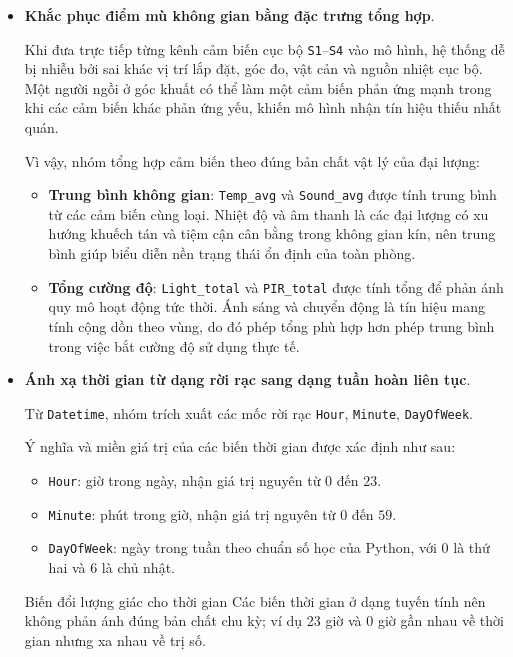 \begin{itemize}
    \item \textbf{Khắc phục điểm mù không gian bằng đặc trưng tổng hợp}.

    Khi đưa trực tiếp từng kênh cảm biến cục bộ \texttt{S1}--\texttt{S4} vào mô hình, hệ thống dễ bị nhiễu bởi sai khác vị trí lắp đặt, góc đo, vật cản và nguồn nhiệt cục bộ. Một người ngồi ở góc khuất có thể làm một cảm biến phản ứng mạnh trong khi các cảm biến khác phản ứng yếu, khiến mô hình nhận tín hiệu thiếu nhất quán.

    Vì vậy, nhóm tổng hợp cảm biến theo đúng bản chất vật lý của đại lượng:
    \begin{itemize}
        \item \textbf{Trung bình không gian}: \texttt{Temp\_avg} và \texttt{Sound\_avg} được tính trung bình từ các cảm biến cùng loại. Nhiệt độ và âm thanh là các đại lượng có xu hướng khuếch tán và tiệm cận cân bằng trong không gian kín, nên trung bình giúp biểu diễn nền trạng thái ổn định của toàn phòng.
        \item \textbf{Tổng cường độ}: \texttt{Light\_total} và \texttt{PIR\_total} được tính tổng để phản ánh quy mô hoạt động tức thời. Ánh sáng và chuyển động là tín hiệu mang tính cộng dồn theo vùng, do đó phép tổng phù hợp hơn phép trung bình trong việc bắt cường độ sử dụng thực tế.
    \end{itemize}

    \item \textbf{Ánh xạ thời gian từ dạng rời rạc sang dạng tuần hoàn liên tục}.

    Từ \texttt{Datetime}, nhóm trích xuất các mốc rời rạc \texttt{Hour}, \texttt{Minute}, \texttt{DayOfWeek}.

    Ý nghĩa và miền giá trị của các biến thời gian được xác định như sau:
    \begin{itemize}
        \item \texttt{Hour}: giờ trong ngày, nhận giá trị nguyên từ $0$ đến $23$.
        \item \texttt{Minute}: phút trong giờ, nhận giá trị nguyên từ $0$ đến $59$.
        \item \texttt{DayOfWeek}: ngày trong tuần theo chuẩn số học của Python, với $0$ là thứ hai và $6$ là chủ nhật.
    \end{itemize}

    \begin{notebox}{Biến đổi lượng giác cho thời gian}
Các biến thời gian ở dạng tuyến tính nên không phản ánh đúng bản chất chu kỳ; ví dụ 23 giờ và 0 giờ gần nhau về thời gian nhưng xa nhau về trị số.


\end{notebox}
\end{itemize}
